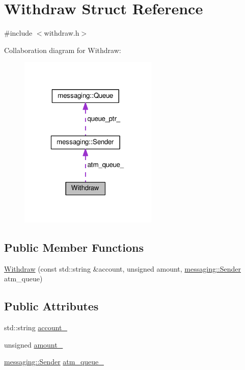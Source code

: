 \hypertarget{structWithdraw}{\section{Withdraw Struct Reference}
\label{structWithdraw}
}


{\ttfamily \#include $<$withdraw.\-h$>$}



Collaboration diagram for Withdraw\-:
\nopagebreak
\begin{figure}[H]
\begin{center}
\leavevmode
\includegraphics[width=187pt]{structWithdraw__coll__graph}
\end{center}
\end{figure}
\subsection*{Public Member Functions}
\begin{DoxyCompactItemize}
\item 
\hyperlink{structWithdraw_af748f757c832cbf3dad2cc8f050a9826}{Withdraw} (const std\-::string \&account, unsigned amount, \hyperlink{classmessaging_1_1Sender}{messaging\-::\-Sender} atm\-\_\-queue)
\end{DoxyCompactItemize}
\subsection*{Public Attributes}
\begin{DoxyCompactItemize}
\item 
std\-::string \hyperlink{structWithdraw_a3dcbc9569c0540c6d5fce8923a9c6109}{account\-\_\-}
\item 
unsigned \hyperlink{structWithdraw_aef16f3caa8a813007062a23d06ee4297}{amount\-\_\-}
\item 
\hyperlink{classmessaging_1_1Sender}{messaging\-::\-Sender} \hyperlink{structWithdraw_ab629acf79446ce7dd973ed3c97c1c99c}{atm\-\_\-queue\-\_\-}
\end{DoxyCompactItemize}


